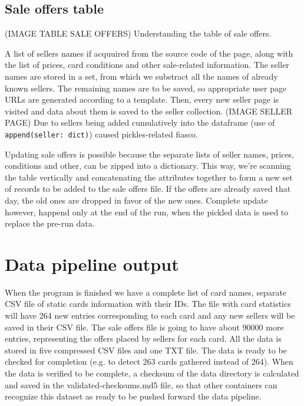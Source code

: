 \subsection{Sale offers table}
(IMAGE TABLE SALE OFFERS)
Understanding the table of sale offers.

A list of sellers names if acquuired from the source code of the page, along with the list of prices, card conditions and other sale-related information. The seller names are stored in a set, from which we substract all the names of already known sellers. The remaining names are to be saved, so appropriate user page URLs are generated according to a template. Then, every new seller page is visited and data about them is saved to the seller collection. (IMAGE SELLER PAGE) Due to sellers being added cumulatively into the dataframe (use of \texttt{append(seller: dict)}) caused pickles-related fiasco. \par
Updating sale offers is possible because the separate lists of seller names, prices, conditions and other, can be zipped into a dictionary. This way, we're scanning the table vertically and concatenating the attributes together to form a new set of records to be added to the sale offers file. If the offers are already saved that day, the old ones are dropped in favor of the new ones. Complete update however, happend only at the end of the run, when the pickled data is used to replace the pre-run data.


\section{Data pipeline output}
When the program is finished we have a complete list of card names, separate CSV file of static cards information with their IDs. The file with card statistics will have 264 new entries corresponding to each card and any new sellers will be saved in their CSV file. The sale offers file is going to have about 90000 more entries, representing the offers placed by sellers for each card. All the data is stored in five compressed CSV files and one TXT file. The data is ready to be checked for completion (e.g. to detect 263 cards gathered instead of 264). When the data is verified to be complete, a checksum of the data directory is calculated and saved in the validated-checksums.md5 file, so that other containers can recognize this dataset as ready to be pushed forward the data pipeline.
